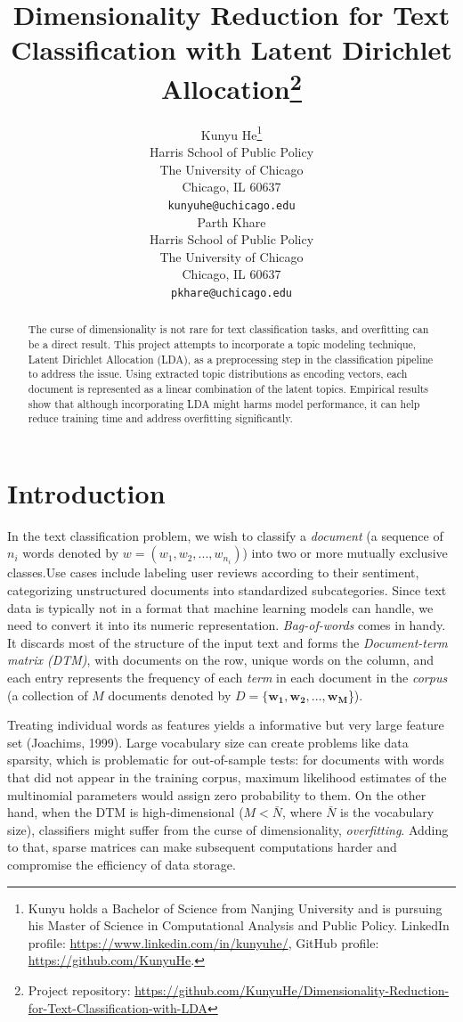 \documentclass{article}
\title{Dimensionality Reduction for Text Classification with Latent Dirichlet Allocation\thanks{Project repository: \url{https://github.com/KunyuHe/Dimensionality-Reduction-for-Text-Classification-with-LDA}}}
\author{%
  Kunyu He\thanks{Kunyu holds a Bachelor of Science from Nanjing University and is pursuing his Master of Science in Computational Analysis and Public Policy. LinkedIn profile: \url{https://www.linkedin.com/in/kunyuhe/}, GitHub profile: \url{https://github.com/KunyuHe}.}\\
  Harris School of Public Policy\\
  The University of Chicago\\
  Chicago, IL 60637 \\
  \texttt{kunyuhe@uchicago.edu} \\
   \AND
   Parth Khare\\
   Harris School of Public Policy\\
   The University of Chicago\\
   Chicago, IL 60637 \\
   \texttt{pkhare@uchicago.edu} \\
}
\begin{document}
\maketitle

\begin{abstract}
The curse of dimensionality is not rare for text classification tasks, and overfitting can be a direct result. This project attempts to incorporate a topic modeling technique, Latent Dirichlet Allocation (LDA), as a preprocessing step in the classification pipeline to address the issue. Using extracted topic distributions as encoding vectors, each document is represented as a linear combination of the latent topics.  Empirical results show that although incorporating LDA might harms model performance, it can help reduce training time and address overfitting significantly.
\end{abstract}

\section{Introduction}
\label{intro}

In the text classification problem, we wish to classify a \emph{document} (a sequence of $n_i$ words denoted by $w=(w_1, w_2, ..., w_{n_i})$) into two or more mutually exclusive classes.Use cases include labeling user reviews according to their sentiment, categorizing unstructured documents into standardized subcategories. Since text data is typically not in a format that machine learning models can handle, we need to convert it into its numeric representation. \emph{Bag-of-words} comes in handy. It discards most of the structure of the input text and forms the \emph{Document-term matrix (DTM)}, with documents on the row, unique words on the column, and each entry represents the frequency of each \emph{term} in each document in the \emph{corpus} (a collection of $M$ documents denoted by $D = \{\bm{w_1}, \bm{w_2}, ..., \bm{w_M}$\}).

Treating individual words as features yields a informative but very large feature set (Joachims, 1999). Large vocabulary size can create problems like data sparsity, which is problematic for out-of-sample tests: for documents with words that did not appear in the training corpus, maximum likelihood estimates of the multinomial parameters would assign zero probability to them. On the other hand, when the DTM is high-dimensional ($M< \bar{N}$, where $\bar{N}$ is the vocabulary size), classifiers might suffer from the curse of dimensionality, \emph{overfitting}. Adding to that, sparse matrices can make subsequent computations harder and compromise the efficiency of data storage.
\end{document}
